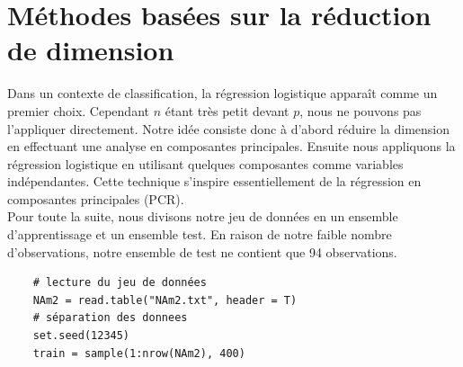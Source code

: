 \documentclass[12pt,a4paper]{article}
\begin{document}
\section{Méthodes basées sur la réduction de dimension}
Dans un contexte de classification, la régression logistique apparaît comme un premier choix. Cependant $n$ étant très petit devant $p$, nous ne pouvons pas l'appliquer directement. Notre idée consiste donc à d'abord réduire la dimension en effectuant une analyse en composantes principales. Ensuite nous appliquons la régression logistique en utilisant quelques composantes comme variables indépendantes. Cette technique s'inspire essentiellement de la régression en composantes principales (PCR).\vspace{2mm}\\
Pour toute la suite, nous divisons notre jeu de données en un ensemble d'apprentissage et un ensemble test. En raison de notre faible nombre d'observations, notre ensemble de test ne contient que 94 observations.\vspace{2mm}
\begin{lstlisting}
	# lecture du jeu de données
	NAm2 = read.table("NAm2.txt", header = T)
	# séparation des donnees
	set.seed(12345)
	train = sample(1:nrow(NAm2), 400)
\end{lstlisting}
\end{document}
